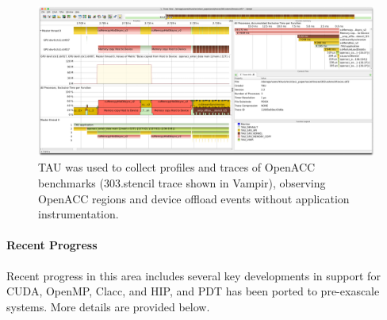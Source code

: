 \begin{figure}[htb]
\centering
\includegraphics[width=6in]{projects/2.3.2-Tools/2.3.2.10-PROTEAS-YTUNE/clacc_tau.png}
\caption{TAU was used to collect profiles and traces of OpenACC benchmarks (303.stencil trace shown in Vampir), observing OpenACC regions and device offload events without application instrumentation.}
\label{figure:tau:clacc}
\end{figure}

\paragraph{Recent Progress}
Recent progress in this area includes several key developments in support for CUDA, OpenMP, Clacc, and HIP, and PDT has been ported to pre-exascale systems. More details are provided below.

